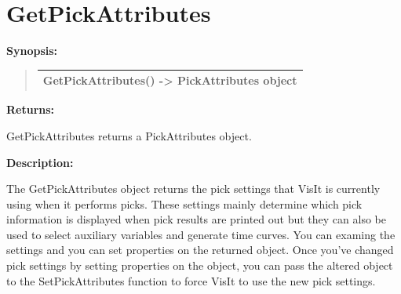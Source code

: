 \documentclass[letterpaper,10pt,english]{sphinxmanual}
\begin{document}
\section{GetPickAttributes}
\label{functions:getpickattributes}
\begin{DUlineblock}{0em}
\item[] \textbf{Synopsis:}
\end{DUlineblock}
\begin{quote}

\begin{tabulary}{\linewidth}{|L|}
\hline

GetPickAttributes() -\textgreater{} PickAttributes object
\\
\hline\end{tabulary}

\end{quote}

\begin{DUlineblock}{0em}
\item[] 
\item[] \textbf{Returns:}
\item[] GetPickAttributes returns a PickAttributes object.
\item[] 
\item[] \textbf{Description:}
\item[] The GetPickAttributes object returns the pick settings that VisIt is
currently using when it performs picks. These settings mainly determine
which pick information is displayed when pick results are printed out but
they can also be used to select auxiliary variables and generate time
curves. You can examing the settings and you can set properties on the
returned object. Once you've changed pick settings by setting properties on
the object, you can pass the altered object to the SetPickAttributes
function to force VisIt to use the new pick settings.
\end{DUlineblock}

\begin{DUlineblock}{0em}
\item[] 
\end{DUlineblock}
\end{document}
